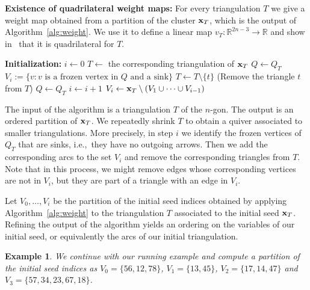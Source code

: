 \documentclass[pdftex]{sigma}%
\newtheorem{Example}[Theorem]{Example}
\numberwithin{equation}{section}
\begin{document}
\noindent
{\bf Existence of quadrilateral weight maps:} For every triangulation $T$ we give a weight map obtained from a partition of the cluster ${\bf x}_T$, which is the output of Algorithm~\ref{alg:weight}.
We use it to define a linear map $v_T\colon \mathbb R^{2n-3}\to \mathbb R$ and show in~ that it is quadrilateral for $T$.
\begin{algorithm}
\caption{Partitioning the cluster ${\bf x}_T$
based on its triangulation $T$ (union of triangles).
}
\label{alg:weight}

\BlankLine
{}
\BlankLine
{\bf Initialization:}
$i\leftarrow 0$\;
$T\leftarrow$ the corresponding triangulation of ${\bf x}_T$\;
$Q\leftarrow Q_T$\;
\BlankLine
{}
{
\BlankLine
$V_i:=\{v \colon v\text{ is a frozen vertex in } Q \text{ and a sink}\}$\;
{
{
$T\leftarrow T\setminus \{t\}$ (Remove the triangle $t$ from $T$)\;
$Q\leftarrow Q_T$\;
}
}
$i\leftarrow i+1$\;
}
$V_i\leftarrow {\bf x}_T\setminus (V_1\cup \cdots\cup V_{i-1})$\;
\;
\end{algorithm}

\medskip

The input of the algorithm is a triangulation $T$ of the $n$-gon. The output is an ordered partition of ${\bf x}_T$.
We repeatedly shrink $T$ to obtain a quiver associated to smaller triangulations.
More precisely, in step $i$ we identify the frozen vertices of $Q_T$ that are sinks, i.e.,~they have no outgoing arrows.
Then we add the corresponding arcs to the set $V_i$ and remove the corresponding triangles from $T$.
Note that in this process, we might remove edges whose corresponding vertices are not in $V_i$, but they are part of a triangle with an edge in $V_i$.

Let $V_0,\dots,V_i$ be the partition of the initial seed indices obtained by applying Algorithm~\ref{alg:weight} to the triangulation $T$ associated to the initial seed ${\bf x}_T$.
Refining the output of the algorithm yields an ordering on the variables of our initial seed, or equivalently the arcs of our initial triangulation.

\begin{Example}
We continue with our running example and compute a partition of the initial seed indices as $V_0=\{56,12,78\}$, $V_1=\{13,45\}$, $V_{2}=\{17,14,47\}$ and $V_{3}=\{57,34,23,67,18\}$.
\end{Example}
\end{document}
